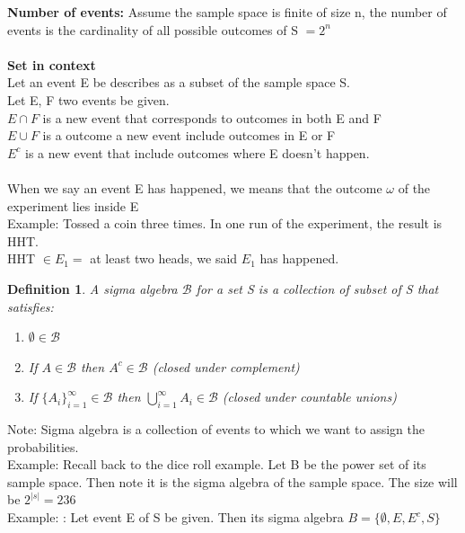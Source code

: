 \documentclass[11pt,oneside]{book}
\theoremstyle{break}
\theoremstyle{break}
\newtheorem{defn}{Definition}[corL]
\newcommand{\note}{\color{Purple}Note: \color{black}}
\newcommand{\example}{\color{WildStrawberry}Example: \color{black}}
\begin{document}
	\textbf{Number of events:} Assume the sample space is finite of size n, the number of events is the cardinality of all possible outcomes of S $=2^n$\\
	\hfill\\
	\textbf{Set in context}\\
	Let an event E be describes as a subset of the sample space S.\\
	Let E, F two events be given.\\
	$E\cap F$ is a new event that corresponds to outcomes in both E and F\\
	$E\cup F$ is a outcome a new event include outcomes in E or F\\
	$E^c$ is a new event that include outcomes where E doesn't happen.\\
	\hfill\\
	When we say an event E has happened, we means that the outcome $\omega$ of the experiment lies inside E\\
	\example Tossed a coin three times. In one run of the experiment, the result is HHT.\\
	HHT $\in E_1=$ at least two heads, we said $E_1$ has happened.\\
	\begin{defn}
	A sigma algebra $\mathcal{B}$ for a set S is a collection of subset of S that satisfies:\begin{enumerate}
	\item $\emptyset \in \mathcal{B}$
	\item If $A\in \mathcal{B}$ then $A^c\in \mathcal{B}$ (closed under complement)
	\item If $\{A_i\}_{i=1}^{\infty} \in \mathcal{B}$ then $\bigcup_{i=1}^{\infty} A_i \in \mathcal{B}$ (closed under countable unions)
	\end{enumerate}
	\end{defn}
	\note 	Sigma algebra is a collection of events to which we want to assign the probabilities.\\
	\example Recall back to the dice roll example. Let B be the power set of its sample space. Then
note it is the sigma algebra of the sample space. The size will be $2^{|s|} = 236$\\
\example: Let event E of S be given. Then its sigma algebra $B = \{\emptyset,E,E^c, S\}$
\end{document}

